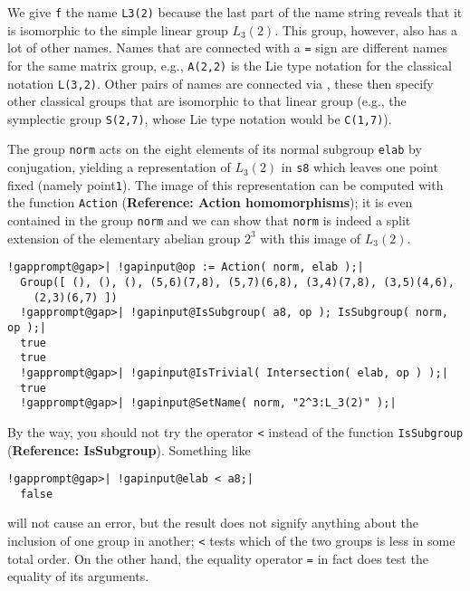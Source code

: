 \documentclass[a4paper,11pt]{report}
\begin{document}
{{ We give \texttt{f} the name \texttt{L{\textunderscore}3(2)} because the last part of the name string reveals that it is isomorphic to the
simple linear group $L_3(2)$. This group, however, also has a lot of other names. Names that are connected
with a \texttt{=} sign are different names for the same matrix group, e.g., \texttt{A(2,2)} is the Lie type notation for the classical notation \texttt{L(3,2)}. Other pairs of names are connected via \texttt{\texttt{}}, these then specify other classical groups that are isomorphic to that linear
group (e.g., the symplectic group \texttt{S(2,7)}, whose Lie type notation would be \texttt{C(1,7)}). 

 The group \texttt{norm} acts on the eight elements of its normal subgroup \texttt{elab} by conjugation, yielding a representation of $L_3(2)$ in \texttt{s8} which leaves one point fixed (namely point{\nobreakspace}\texttt{1}). The image of this representation can be computed with the function \texttt{Action} (\textbf{Reference: Action homomorphisms}); it is even contained in the group \texttt{norm} and we can show that \texttt{norm} is indeed a split extension of the elementary abelian group $2^3$ with this image of $L_3(2)$. 

 
\begin{Verbatim}[commandchars=!@|,fontsize=\small,frame=single,label=Example]
  !gapprompt@gap>| !gapinput@op := Action( norm, elab );|
  Group([ (), (), (), (5,6)(7,8), (5,7)(6,8), (3,4)(7,8), (3,5)(4,6), 
    (2,3)(6,7) ])
  !gapprompt@gap>| !gapinput@IsSubgroup( a8, op ); IsSubgroup( norm, op );|
  true
  true
  !gapprompt@gap>| !gapinput@IsTrivial( Intersection( elab, op ) );|
  true
  !gapprompt@gap>| !gapinput@SetName( norm, "2^3:L_3(2)" );|
\end{Verbatim}
 

 By the way, you should not try the operator \texttt{{\textless}} instead of the function \texttt{IsSubgroup} (\textbf{Reference: IsSubgroup}). Something like 

 
\begin{Verbatim}[commandchars=!@|,fontsize=\small,frame=single,label=Example]
  !gapprompt@gap>| !gapinput@elab < a8;|
  false
\end{Verbatim}
 

 will not cause an error, but the result does not signify anything about the
inclusion of one group in another; \texttt{{\textless}} tests which of the two groups is less in some total order. On the other hand,
the equality operator \texttt{=} in fact does test the equality of its arguments. 

}}
\end{document}
